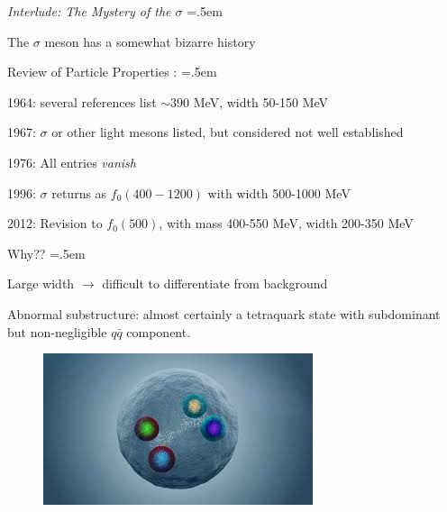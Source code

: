 \documentclass[xcolor={dvipsnames}]{beamer}
\let\olditemize=\itemize
\let\endolditemize=\enditemize
\renewenvironment{itemize}{\olditemize \itemsep=.5em }{\endolditemize}
\begin{document}
\begin{frame}{\textit{Interlude: The Mystery of the $\sigma$}}
\alert{}
\begin{itemize}
    \item<1-> The $\sigma$ meson has a somewhat bizarre history
    \item<2-> Review of Particle Properties \cite{Pel_ez_2016}:
    \begin{itemize}
        \item<3-> 1964: several references list $\sim390$ MeV, width 50-150 MeV 
        \item<4-> 1967: $\sigma$ or other light mesons listed, but considered not well established
        \item<5-> 1976: All entries \textit{vanish}
        \item<6-> 1996: $\sigma$ returns as $f_0(400-1200)$ with width 500-1000 MeV
        \item<7-> 2012: Revision to $f_0(500)$, with mass 400-550 MeV, width 200-350 MeV
    \end{itemize}
    \item<8-> Why??
    \begin{itemize}
        \item<9-> Large width $\rightarrow$ difficult to differentiate from background
        \item<10-> Abnormal substructure: almost certainly a tetraquark state with subdominant but non-negligible $q\bar{q}$ component.
    \end{itemize}
\end{itemize}
\end{frame}

\begin{frame}
    \begin{figure}
        \centering
        \includegraphics[scale=1.5]{tetraquark.png}
    \end{figure}
\end{frame}
\end{document}
